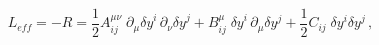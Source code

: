 \begin{equation}
    L_{eff} = - R = \frac{1}{2} A^{\mu \nu}_{ij} \;
    \partial_{\mu}{\delta y}^i \, \partial_{\nu}{\delta y}^j
    + B^{\mu}_{ij}\; {\delta y}^i \,
    \partial_\mu \delta y^j + \frac{1}{2}C_{ij}\;
    \delta y^i \delta y^j \, ,
\end{equation}

